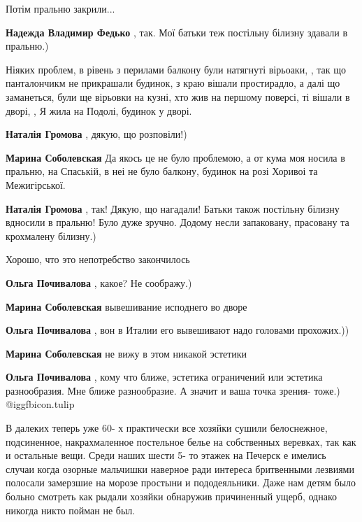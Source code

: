 \begin{itemize}
Потім пральню закрили...

\textbf{Надежда Владимир Федько} , так. Мої батьки теж постільну білизну здавали в пральню.)


Ніяких проблем, в рівень з перилами балкону були натягнуті вірьоаки, , так що
панталончикм не прикрашали будинок, з краю вішали простирадло, а далі що
заманеться, були ще вірьовки на кузні, хто жив на першому поверсі, ті вішали в
дворі, , Я жила на Подолі, будинок у дворі.

\begin{itemize} %
\textbf{Наталія Громова} , дякую, що розповіли!)

\textbf{Марина Соболевская} Да якось це не було проблемою, а от кума моя носила в пральню, на Спаській, в неі не було балкону, будинок на розі Хоривоі та Межигірської.

\textbf{Наталія Громова} , так! Дякую, що нагадали! Батьки також постільну білизну вдносили в пральню! Було дуже зручно. Додому несли запаковану, прасовану та крохмалену білизну.)
\end{itemize} %

Хорошо, что это непотребство закончилось

\begin{itemize} %
\textbf{Ольга Почивалова} , какое? Не соображу.)

\textbf{Марина Соболевская} вывешивание исподнего во дворе

\textbf{Ольга Почивалова} , вон в Италии его вывешивают надо головами прохожих.))

\textbf{Марина Соболевская} не вижу в этом никакой эстетики

\textbf{Ольга Почивалова} , кому что ближе, эстетика ограничений или эстетика разнообразия. Мне ближе разнообразие. А значит и ваша точка зрения- тоже.)  @igg{fbicon.tulip} 

\end{itemize} %


В далеких теперь уже 60- х практически все хозяйки сушили белоснежное,
подсиненное, накрахмаленное постельное белье на собственных веревках, так как и
остальные вещи. Среди наших шести 5- то этажек на Печерск е имелись случаи
когда озорные мальчишки наверное ради интереса бритвенными лезвиями полосали
замерзшие на морозе простыни и пододеяльники. Даже нам детям было больно
смотреть как рыдали хозяйки обнаружив причиненный ущерб, однако никогда никто
пойман не был.


\end{itemize}
